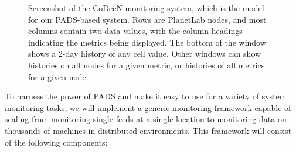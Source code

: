 \begin{figure}[t]
\begin{center}
\centerline{}
\end{center}
\caption{\label{fig_codeenmon}Screenshot of the CoDeeN monitoring
system, which is the model for our PADS-based system. Rows are
PlanetLab nodes, and most columns contain two data values, with the
column headings indicating the metrics being displayed. The bottom of
the window shows a 2-day history of any cell value. Other windows can
show histories on all nodes for a given metric, or histories of all
metrics for a given node.}
\end{figure}

To harness the power of PADS and make it easy to use for a variety of
system monitoring tasks, we will implement a generic monitoring
framework capable of scaling from monitoring single feeds at a single
location to monitoring data on thousands of machines in distributed
environments. This framework will consist of the following components:

